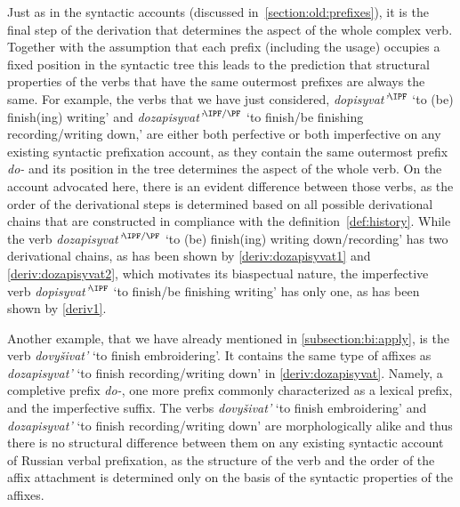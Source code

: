 Just as in the syntactic accounts (discussed in~\ref{section:old:prefixes}), it is the final step of the derivation that determines the aspect of the whole complex verb. Together with the assumption that each prefix (including the usage) occupies a fixed position in the syntactic tree this leads to the prediction that structural properties of the verbs that have the same outermost prefixes are always the same. For example, the verbs that we have just considered, \textit{dopisyvat'}$^\IPF$ `to (be) finish(ing) writing' and \textit{dozapisyvat'}$^{\IPF/\PF}$ `to finish/be finishing recording/writing down,' are either both perfective or both imperfective on any existing syntactic prefixation account, as they contain the same outermost prefix \textit{do-} and its position in the tree determines the aspect of the whole verb. On the account advocated here, there is an evident difference between those verbs, as the order of the derivational steps is determined based on all possible derivational chains that are constructed in compliance with the definition~\ref{def:history}. While the verb \textit{dozapisyvat'}$^{\IPF/\PF}$ `to (be) finish(ing) writing down/recording' has two derivational chains, as has been shown by \ref{deriv:dozapisyvat1} and \ref{deriv:dozapisyvat2}, which motivates its biaspectual nature, the imperfective verb \textit{dopisyvat'}$^\IPF$ `to finish/be finishing writing' has only one, as has been shown by \ref{deriv1}.

Another example, that we have already mentioned in \ref{subsection:bi:apply}, is the verb \textit{dovy\v{s}ivat'} `to finish embroidering'. It contains the same type of affixes as \textit{dozapisyvat'} `to finish recording/writing down' in \ref{deriv:dozapisyvat}. Namely, a completive prefix \textit{do-}, one more prefix commonly characterized as a lexical prefix, and the imperfective suffix. The verbs \textit{dovy\v{s}ivat'} `to finish embroidering' and \textit{dozapisyvat'} `to finish recording/writing down' are morphologically alike and thus there is no structural difference between them on any existing syntactic account of Russian verbal prefixation, as the structure of the verb and the order of the affix attachment is determined only on the basis of the syntactic properties of the affixes.
 
